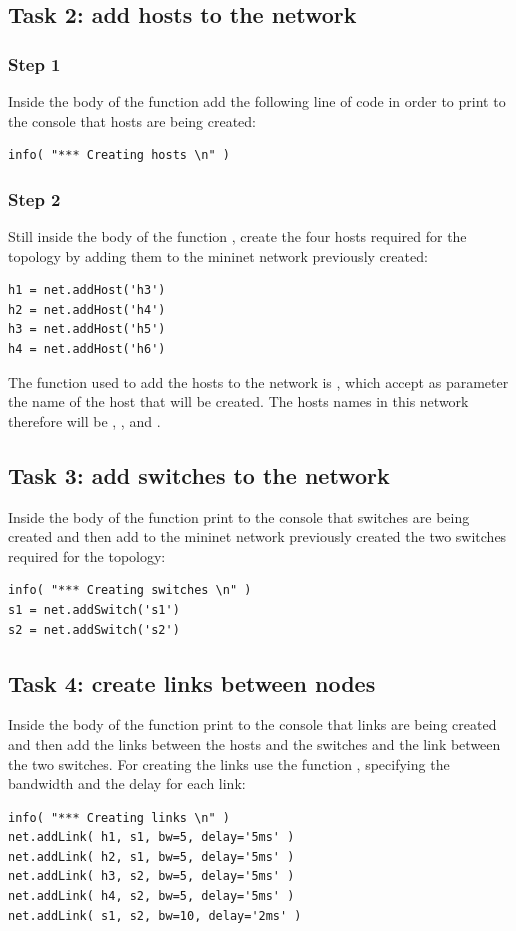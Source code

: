 \subsection*{Task 2: add hosts to the network}
\subsubsection*{Step 1}
Inside the body of the function  add the following line
of code in order to print to the console that hosts are being created:
\begin{lstlisting}
info( "*** Creating hosts \n" )
\end{lstlisting}

\subsubsection*{Step 2}
Still inside the body of the function , create the
four hosts required for the topology by adding them to the mininet network
previously created:
\begin{lstlisting}
h1 = net.addHost('h3')
h2 = net.addHost('h4')
h3 = net.addHost('h5')
h4 = net.addHost('h6')
\end{lstlisting}
The function used to add the hosts to the network is , which
accept as parameter the name of the host that will be created. The hosts names in
this network therefore will be , ,  and .





\subsection*{Task 3: add switches to the network}
Inside the body of the function  print to the console
that switches are being created and then add to the mininet network previously
created the two switches required for the topology:
\begin{lstlisting}
info( "*** Creating switches \n" )
s1 = net.addSwitch('s1')
s2 = net.addSwitch('s2')
\end{lstlisting}







\subsection*{Task 4: create links between nodes}
Inside the body of the function  print to the console
that links are being created and then add the links between the hosts and the
switches and the link between the two switches. For creating the links
use the function , specifying the bandwidth and the delay for each link:
\begin{lstlisting}
info( "*** Creating links \n" )
net.addLink( h1, s1, bw=5, delay='5ms' )
net.addLink( h2, s1, bw=5, delay='5ms' )
net.addLink( h3, s2, bw=5, delay='5ms' )
net.addLink( h4, s2, bw=5, delay='5ms' )
net.addLink( s1, s2, bw=10, delay='2ms' )
\end{lstlisting}

